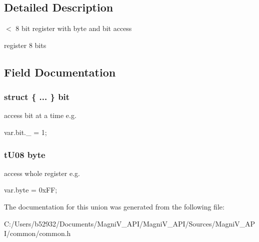 \subsection{Detailed Description}
$<$ 8 bit register with byte and bit access 

register 8 bits 

\subsection{Field Documentation}
\hypertarget{unionu_r_e_g08_aa2f8474dc62c9ed43e927c04a4c9319d}{}
\subsubsection[{bit}]{\setlength{\rightskip}{0pt plus 5cm}struct \{ ... \}  bit}\label{unionu_r_e_g08_aa2f8474dc62c9ed43e927c04a4c9319d}


access bit at a time e.\+g. 

var.\+bit.\+\_ = 1; \hypertarget{unionu_r_e_g08_aba308d63db050aed25cfd36c37e41ad4}{}
\subsubsection[{byte}]{\setlength{\rightskip}{0pt plus 5cm}t\+U08 byte}\label{unionu_r_e_g08_aba308d63db050aed25cfd36c37e41ad4}


access whole register e.\+g. 

var.\+byte = 0x\+F\+F; 

The documentation for this union was generated from the following file\+:\begin{DoxyCompactItemize}
\item 
C\+:/\+Users/b52932/\+Documents/\+Magni\+V\+\_\+\+A\+P\+I/\+Magni\+V\+\_\+\+A\+P\+I/\+Sources/\+Magni\+V\+\_\+\+A\+P\+I/common/common.\+h\end{DoxyCompactItemize}
